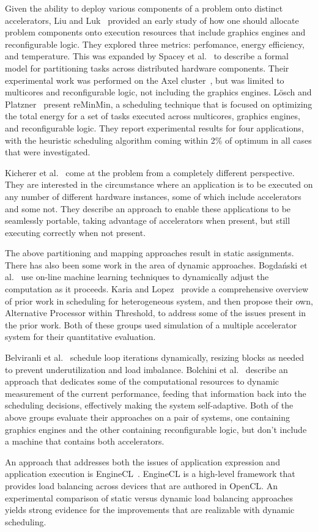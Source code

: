 Given the ability to deploy various components of a problem onto distinct
accelerators, Liu and Luk~\cite{ll11,ll12} provided an early study of how one
should allocate problem components onto execution resources that include
graphics engines and reconfigurable logic.  They explored
three metrics: perfomance, energy efficiency, and temperature.
This was expanded by Spacey et al.~\cite{slkk13} to describe a formal
model for partitioning tasks across distributed hardware components.
Their experimental work was performed on the Axel cluster~\cite{tl10},
but was limited to multicores and reconfigurable logic, not including
the graphics engines.
L\"{o}sch and Platzner~\cite{lp17} present reMinMin, a scheduling technique
that is focused on optimizing the total energy for a set of tasks executed
across multicores, graphics engines, and reconfigurable logic.  They
report experimental results for four applications, with the heuristic
scheduling algorithm coming within 2\% of optimum in all cases that
were investigated.

Kicherer et al.~\cite{knbk12} come at the problem from a completely
different perspective.  They are interested in the circumstance where an
application is to be executed on any number of different hardware instances,
some of which include accelerators and some not.  They describe an approach
to enable these applications to be seamlessly portable, taking advantage of
accelerators when present, but still executing correctly when not present.

The above partitioning and mapping approaches result in static assignments.
There has also been some work in the area of dynamic approaches.
Bogda\'{n}ski et al.~\cite{blby11} use on-line machine learning techniques to
dynamically adjust the computation as it proceeds.
Karia and Lopez~\cite{kl17} provide a comprehensive overview of prior
work in scheduling for heterogeneous system, and then propose their own,
Alternative Processor within Threshold, to address some of the issues
present in the prior work.
Both of these groups used simulation
of a multiple accelerator system for their quantitative evaluation.

Belviranli et al.~\cite{bbg13} schedule loop iterations dynamically, resizing
blocks as needed to prevent underutilization and load imbalance.
Bolchini et al.~\cite{bdm+15} describe an approach that dedicates some of the
computational resources to dynamic measurement of the current performance,
feeding that information back into the scheduling decisions, effectively
making the system self-adaptive.
Both of the above groups
evaluate their approaches on a pair of systems, one containing graphics
engines and the other containing reconfigurable logic, but don't include
a machine that contains both accelerators.

An approach that addresses both the issues of application expression
and application execution is EngineCL~\cite{dng+19}.  EngineCL is a
high-level framework that provides load balancing across devices that
are authored in OpenCL.  An experimental comparison of static versus
dynamic load balancing approaches yields strong evidence for the
improvements that are realizable with dynamic scheduling.

